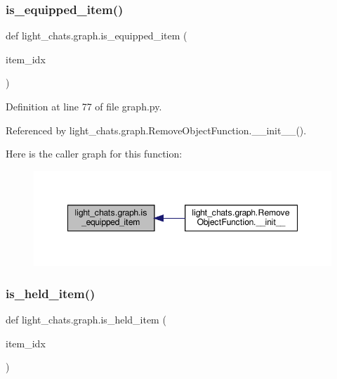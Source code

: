 \subsubsection{\texorpdfstring{is\+\_\+equipped\+\_\+item()}{is\_equipped\_item()}}
{\footnotesize\ttfamily def light\+\_\+chats.\+graph.\+is\+\_\+equipped\+\_\+item (\begin{DoxyParamCaption}\item[{}]{item\+\_\+idx }\end{DoxyParamCaption})}



Definition at line 77 of file graph.\+py.



Referenced by light\+\_\+chats.\+graph.\+Remove\+Object\+Function.\+\_\+\+\_\+init\+\_\+\+\_\+().

Here is the caller graph for this function\+:
\nopagebreak
\begin{figure}[H]
\begin{center}
\leavevmode
\includegraphics[width=348pt]{namespacelight__chats_1_1graph_a76960b89046df1b0cda1de931fa1fd69_icgraph}
\end{center}
\end{figure}
\mbox{\label{namespacelight__chats_1_1graph_aa0be6ee7e9f549a7195bea9dfb962ad6}} 
\subsubsection{\texorpdfstring{is\+\_\+held\+\_\+item()}{is\_held\_item()}}
{\footnotesize\ttfamily def light\+\_\+chats.\+graph.\+is\+\_\+held\+\_\+item (\begin{DoxyParamCaption}\item[{}]{item\+\_\+idx }\end{DoxyParamCaption})}



